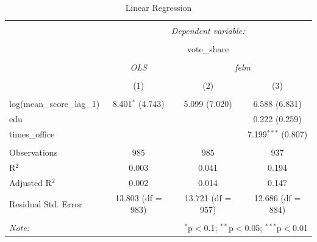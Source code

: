 \documentclass[12pt,]{article}
\begin{document}
\footnotesize

\begin{table}[!htbp] \centering 
  \caption{Linear Regression} 
  \label{} 
\begin{tabular}{@{\extracolsep{5pt}}lccc} 
\\[-1.8ex]\hline 
\hline \\[-1.8ex] 
 & \multicolumn{3}{c}{\textit{Dependent variable:}} \\ 
\cline{2-4} 
\\[-1.8ex] & \multicolumn{3}{c}{vote\_share} \\ 
\\[-1.8ex] & \textit{OLS} & \multicolumn{2}{c}{\textit{felm}} \\ 
\\[-1.8ex] & (1) & (2) & (3)\\ 
\hline \\[-1.8ex] 
 log(mean\_score\_lag\_1) & 8.401$^{*}$ (4.743) & 5.099 (7.020) & 6.588 (6.831) \\ 
  edu &  &  & 0.222 (0.259) \\ 
  times\_office &  &  & 7.199$^{***}$ (0.807) \\ 
 \hline \\[-1.8ex] 
Observations & 985 & 985 & 937 \\ 
R$^{2}$ & 0.003 & 0.041 & 0.194 \\ 
Adjusted R$^{2}$ & 0.002 & 0.014 & 0.147 \\ 
Residual Std. Error & 13.803 (df = 983) & 13.721 (df = 957) & 12.686 (df = 884) \\ 
\hline 
\hline \\[-1.8ex] 
\textit{Note:}  & \multicolumn{3}{r}{$^{*}$p$<$0.1; $^{**}$p$<$0.05; $^{***}$p$<$0.01} \\ 
\end{tabular} 
\end{table}
\end{document}
